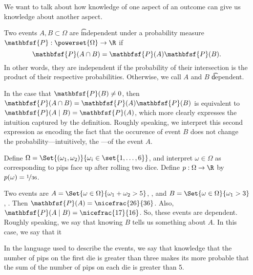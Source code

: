 
We want to talk about how knowledge of one aspect of an outcome can give us knowledge about another aspect.


Two events $A, B \subset \Omega $ are \t{independent} under a probability measure $\mathbfsf{P} : \powerset{\Omega } \to \R $ if
  \[
\mathbfsf{P} (A \cap B) = \mathbfsf{P} (A)\mathbfsf{P} (B).
  \]
In other words, they are independent if the probability of their intersection is the product of their respective probabilities.
Otherwise, we call $A$ and $B$ \t{dependent}.

In the case that $\mathbfsf{P} (B) \neq 0$, then $\mathbfsf{P} (A \cap B) = \mathbfsf{P} (A)\mathbfsf{P} (B)$ is equivalent to $\mathbfsf{P} (A \mid B) = \mathbfsf{P} (A)$, which more clearly expresses the intuition captured by the definition.
Roughly speaking, we interpret this second expression as encoding the fact that the occurence of event $B$ does not change the probability---intuitively, the ---of the event $A$.


Define $\Omega  = \Set{(\omega _1, \omega _2)}{ \omega _i \in \set{1, \dots, 6}}$, and interpret $\omega  \in \Omega $ as corresponding to pips face up after rolling two dice.
Define $p: \Omega  \to \R $ by $p(\omega ) = \nicefrac{1}{36}$.

Two events are $A = \Set{\omega  \in \Omega }{ \omega _1 + \omega _2 > 5}$, , and $B = \Set{\omega  \in \Omega }{\omega _1 > 3}$, .
Then $\mathbfsf{P} (A) = \nicefrac{26}{36}$.
Also, $\mathbfsf{P} (A \mid B) = \nicefrac{17}{16}$.
So, these events are dependent.
Roughly speaking, we say that knowing $B$ tells us something about $A$.
In this case, we say that it 

In the language used to describe the events, we say that knowledge that the number of pips on the first die is greater than three makes its more probable that the sum of the number of pips on each die is greater than 5.

